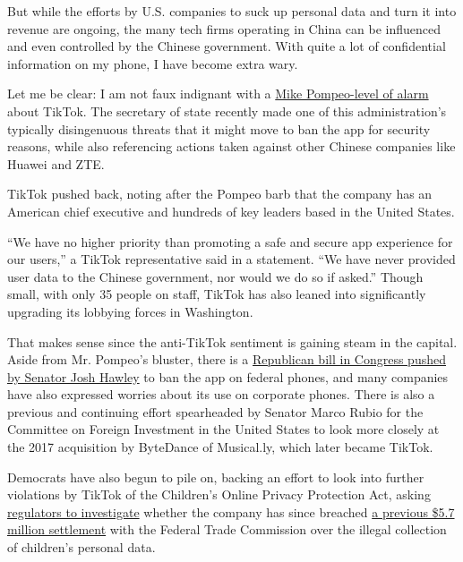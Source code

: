 But while the efforts by U.S. companies to suck up personal data and
turn it into revenue are ongoing, the many tech firms operating in China
can be influenced and even controlled by the Chinese government. With
quite a lot of confidential information on my phone, I have become extra
wary.

Let me be clear: I am not faux indignant with a
\href{https://www.nytimes.com/reuters/2020/07/07/business/07reuters-usa-tiktok-china-pompeo.html}{Mike
Pompeo-level of alarm} about TikTok. The secretary of state recently
made one of this administration's typically disingenuous threats that it
might move to ban the app for security reasons, while also referencing
actions taken against other Chinese companies like Huawei and ZTE.

TikTok pushed back, noting after the Pompeo barb that the company has an
American chief executive and hundreds of key leaders based in the United
States.

``We have no higher priority than promoting a safe and secure app
experience for our users,'' a TikTok representative said in a statement.
``We have never provided user data to the Chinese government, nor would
we do so if asked.'' Though small, with only 35 people on staff, TikTok
has also leaned into significantly upgrading its lobbying forces in
Washington.

That makes sense since the anti-TikTok sentiment is gaining steam in the
capital. Aside from Mr. Pompeo's bluster, there is a
\href{https://www.nytimes.com/reuters/2020/07/15/technology/15reuters-usa-legislation-tiktok.html}{Republican
bill in Congress pushed by Senator Josh Hawley} to ban the app on
federal phones, and many companies have also expressed worries about its
use on corporate phones. There is also a previous and continuing effort
spearheaded by Senator Marco Rubio for the Committee on Foreign
Investment in the United States to look more closely at the 2017
acquisition by ByteDance of Musical.ly, which later became TikTok.

Democrats have also begun to pile on, backing an effort to look into
further violations by TikTok of the Children's Online Privacy Protection
Act, asking
\href{https://www.nytimes.com/reuters/2020/07/07/business/07reuters-tiktok-privacy-children-exclusive.html}{regulators
to investigate} whether the company has since breached
\href{https://www.ftc.gov/news-events/press-releases/2019/02/video-social-networking-app-musically-agrees-settle-ftc}{a
previous \$5.7 million settlement} with the Federal Trade Commission
over the illegal collection of children's personal data.

